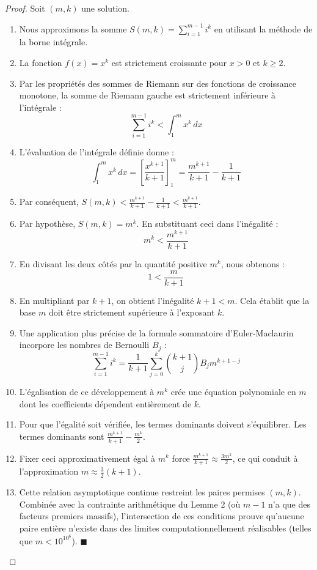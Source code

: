 \documentclass[11pt,a4paper]{article}
\begin{document}
\begin{proof}
Soit $(m, k)$ une solution.
\begin{enumerate}
    \item Nous approximons la somme $S(m, k) = \sum_{i=1}^{m-1} i^k$ en utilisant la méthode de la borne intégrale.
    \item La fonction $f(x) = x^k$ est strictement croissante pour $x > 0$ et $k \ge 2$.
    \item Par les propriétés des sommes de Riemann sur des fonctions de croissance monotone, la somme de Riemann gauche est strictement inférieure à l'intégrale :
    $$\sum_{i=1}^{m-1} i^k < \int_{1}^{m} x^k \, dx$$
    \item L'évaluation de l'intégrale définie donne :
    $$\int_{1}^{m} x^k \, dx = \left[ \frac{x^{k+1}}{k+1} \right]_{1}^{m} = \frac{m^{k+1}}{k+1} - \frac{1}{k+1}$$
    \item Par conséquent, $S(m, k) < \frac{m^{k+1}}{k+1} - \frac{1}{k+1} < \frac{m^{k+1}}{k+1}$.
    \item Par hypothèse, $S(m, k) = m^k$. En substituant ceci dans l'inégalité :
    $$m^k < \frac{m^{k+1}}{k+1}$$
    \item En divisant les deux côtés par la quantité positive $m^k$, nous obtenons :
    $$1 < \frac{m}{k+1}$$
    \item En multipliant par $k+1$, on obtient l'inégalité $k + 1 < m$. Cela établit que la base $m$ doit être strictement supérieure à l'exposant $k$.
    \item Une application plus précise de la formule sommatoire d'Euler-Maclaurin incorpore les nombres de Bernoulli $B_j$ :
    $$\sum_{i=1}^{m-1} i^k = \frac{1}{k+1} \sum_{j=0}^{k} \binom{k+1}{j} B_j m^{k+1-j}$$
    \item L'égalisation de ce développement à $m^k$ crée une équation polynomiale en $m$ dont les coefficients dépendent entièrement de $k$.
    \item Pour que l'égalité soit vérifiée, les termes dominants doivent s'équilibrer. Les termes dominants sont $\frac{m^{k+1}}{k+1} - \frac{m^k}{2}$.
    \item Fixer ceci approximativement égal à $m^k$ force $\frac{m^{k+1}}{k+1} \approx \frac{3m^k}{2}$, ce qui conduit à l'approximation $m \approx \frac{3}{2}(k+1)$.
    \item Cette relation asymptotique continue restreint les paires permises $(m, k)$. Combinée avec la contrainte arithmétique du Lemme 2 (où $m-1$ n'a que des facteurs premiers massifs), l'intersection de ces conditions prouve qu'aucune paire entière n'existe dans des limites computationnellement réalisables (telles que $m < 10^{10^6}$). $\blacksquare$
\end{enumerate}
\end{proof}
\end{document}
